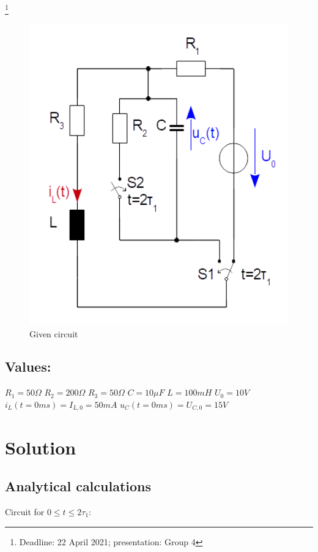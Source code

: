 \documentclass[a4paper]{article}
\newcommand\blfootnote[1]{%
	\begingroup
	\renewcommand\thefootnote{}\footnote{#1}%
	\addtocounter{footnote}{-1}%
	\endgroup
}
\begin{document}
	\vspace*{8cm}
	
\blfootnote{Deadline: 22 April 2021; \qquad presentation: Group 4}

\newpage	
\vspace*{4cm}
\begin{figure}[h!]
		\centering
			\includegraphics[width = 350pt]{./Figures/homework04_circuit.png}
			\caption{Given circuit}
			\label{fig:circuit_hw04}
\end{figure}

\vspace*{2cm} \subsection*{Values:}
$R_1 = 50\Omega$ \qquad $R_2 = 200\Omega$ \qquad $R_3 = 50\Omega$ \qquad $C = 10\mu F$ \qquad $L = 100mH$ \qquad $U_0 = 10V$ \newline 
$i_L(t=0ms)=I_{L,0}=50mA$ \qquad $u_C(t=0ms) = U_{C,0} = 15V$

\newpage
\section{Solution}
\subsection{Analytical calculations}
Circuit for $0 \leq t \leq 2\tau_1$:
\end{document}
